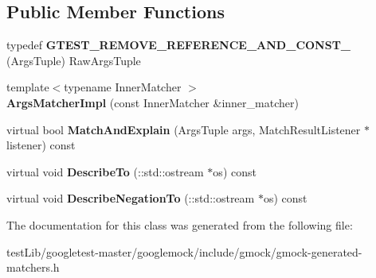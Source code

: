 \subsection*{Public Member Functions}
\begin{DoxyCompactItemize}
\item 
\mbox{\label{classtesting_1_1internal_1_1ArgsMatcherImpl_a7b0cadc369c0c20cd254cc2052782301}} 
typedef {\bfseries G\+T\+E\+S\+T\+\_\+\+R\+E\+M\+O\+V\+E\+\_\+\+R\+E\+F\+E\+R\+E\+N\+C\+E\+\_\+\+A\+N\+D\+\_\+\+C\+O\+N\+S\+T\+\_\+} (Args\+Tuple) Raw\+Args\+Tuple
\item 
\mbox{\label{classtesting_1_1internal_1_1ArgsMatcherImpl_a7f7a9a826d130d11fe30633d79f59a06}} 
{\footnotesize template$<$typename Inner\+Matcher $>$ }\\{\bfseries Args\+Matcher\+Impl} (const Inner\+Matcher \&inner\+\_\+matcher)
\item 
\mbox{\label{classtesting_1_1internal_1_1ArgsMatcherImpl_a60383b3073a61f9d82cbf31fe19e6bfa}} 
virtual bool {\bfseries Match\+And\+Explain} (Args\+Tuple args, Match\+Result\+Listener $\ast$listener) const
\item 
\mbox{\label{classtesting_1_1internal_1_1ArgsMatcherImpl_a8e057f67b368f7d94aeb0ddd35837c94}} 
virtual void {\bfseries Describe\+To} (\+::std\+::ostream $\ast$os) const
\item 
\mbox{\label{classtesting_1_1internal_1_1ArgsMatcherImpl_ac8ff5369879836567cedb5434bcca5b9}} 
virtual void {\bfseries Describe\+Negation\+To} (\+::std\+::ostream $\ast$os) const
\end{DoxyCompactItemize}


The documentation for this class was generated from the following file\+:\begin{DoxyCompactItemize}
\item 
test\+Lib/googletest-\/master/googlemock/include/gmock/gmock-\/generated-\/matchers.\+h\end{DoxyCompactItemize}
